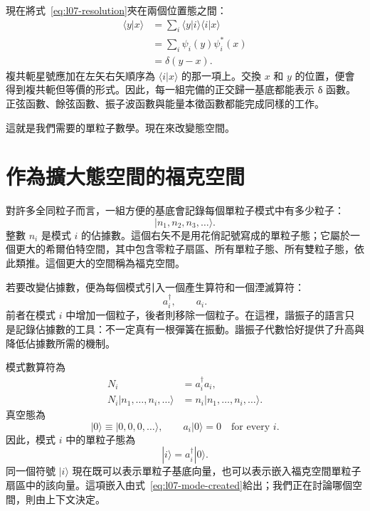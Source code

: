 現在將式~\eqref{eq:l07-resolution}夾在兩個位置態之間：
\begin{align}
\langle y|x\rangle
&=\sum_i\langle y|i\rangle\langle i|x\rangle \\
&=\sum_i\psi_i(y)\psi_i^*(x) \\
&=\delta(y-x).
\label{eq:l07-position-completeness}
\end{align}
複共軛星號應加在左矢右矢順序為 \(\langle i|x\rangle\) 的那一項上。交換 \(x\) 和 \(y\) 的位置，便會得到複共軛但等價的形式。因此，每一組完備的正交歸一基底都能表示 {\proseunicodefont δ} 函數。正弦函數、餘弦函數、振子波函數與能量本徵函數都能完成同樣的工作。

\begin{classroomqa}
\end{classroomqa}

這就是我們需要的單粒子數學。現在來改變態空間。

\section{作為擴大態空間的福克空間}

對許多全同粒子而言，一組方便的基底會記錄每個單粒子模式中有多少粒子：
\begin{equation}
|n_1,n_2,n_3,\ldots\rangle.
\label{eq:l07-fock-basis}
\end{equation}
整數 \(n_i\) 是模式 \(i\) 的佔據數。這個右矢不是用花俏記號寫成的單粒子態；它屬於一個更大的希爾伯特空間，其中包含零粒子扇區、所有單粒子態、所有雙粒子態，依此類推。這個更大的空間稱為福克空間。

若要改變佔據數，便為每個模式引入一個產生算符和一個湮滅算符：
\begin{equation}
a_i^\dagger,\qquad a_i.
\end{equation}
前者在模式 \(i\) 中增加一個粒子，後者則移除一個粒子。在這裡，諧振子的語言只是記錄佔據數的工具：不一定真有一根彈簧在振動。諧振子代數恰好提供了升高與降低佔據數所需的機制。

模式數算符為
\begin{equation}
\begin{aligned}
N_i&=a_i^\dagger a_i,\\
N_i|n_1,\ldots,n_i,\ldots\rangle
&=n_i|n_1,\ldots,n_i,\ldots\rangle.
\end{aligned}
\end{equation}
真空態為
\begin{equation}
|0\rangle\equiv|0,0,0,\ldots\rangle,
\qquad
a_i|0\rangle=0
\quad\text{for every }i.
\label{eq:l07-vacuum}
\end{equation}
因此，模式 \(i\) 中的單粒子態為
\begin{equation}
|i\rangle=a_i^\dagger|0\rangle.
\label{eq:l07-mode-created}
\end{equation}
同一個符號 \(|i\rangle\) 現在既可以表示單粒子基底向量，也可以表示嵌入福克空間單粒子扇區中的該向量。這項嵌入由式~\eqref{eq:l07-mode-created}給出；我們正在討論哪個空間，則由上下文決定。


